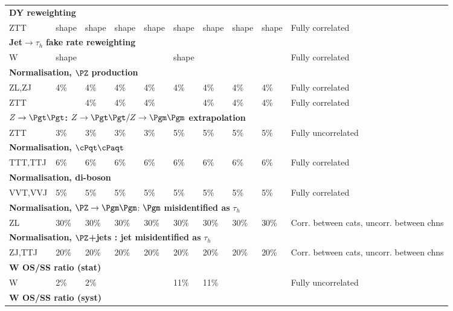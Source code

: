 \begin{table}[!h]
\begin{center}
{\begin{tabular}{p{2cm}|p{1cm}p{1cm}p{1cm}p{1cm}|p{1cm}p{1cm}p{1cm}p{1cm}|p{3cm}}
    \multicolumn{10}{l}{\textbf{DY reweighting } }\\
    ZTT       & shape & shape & shape & shape  & shape & shape & shape & shape &Fully correlated              \\
    \hline
    \multicolumn{10}{l}{\textbf{Jet}$\rightarrow\tau_h$ \textbf{fake rate reweighting } }\\
    W         & shape &  &  &   & shape &  &  &  &Fully correlated              \\
    \hline
    \multicolumn{10}{l}{\textbf{Normalisation, }$\PZ$ \textbf{production} }\\
    ZL,ZJ       & 4\% & 4\% & 4\% & 4\% & 4\%  & 4\% & 4\% & 4\% & Fully correlated              \\
    ZTT         &  & 4\% & 4\% & 4\% &  & 4\% & 4\% & 4\% & Fully correlated              \\
   \multicolumn{10}{l}{ $Z\to\Pgt\Pgt$\textbf{: $Z\to\Pgt\Pgt / Z\to\Pgm\Pgm$ extrapolation } } \\
    ZTT         & 3\% & 3\% & 3\% & 3\% & 5\% & 5\% & 5\% & 5\% & Fully uncorrelated           \\
    \multicolumn{10}{l}{\textbf{Normalisation,} $\cPqt\cPaqt$}\\
    TTT,TTJ     & 6\% & 6\% & 6\% & 6\%   & 6\% & 6\% &6\% & 6\%  & Fully correlated                \\
    \multicolumn{10}{l}{\textbf{Normalisation, di-boson} } \\
    VVT,VVJ     & 5\% & 5\% & 5\% & 5\%   & 5\% & 5\% & 5\% & 5\% & Fully correlated         \\
   \multicolumn{10}{l}{ \textbf{Normalisation,} $\PZ\to\Pgm\Pgm$: $\Pgm$ \textbf{misidentified as} $\tau_{h}$ }\\
    ZL     & 30\%  & 30\% & 30\% & 30\%   & 30\% & 30\% & 30\% &30\% &Corr. between cats, uncorr. between chns        \\
    \multicolumn{10}{l}{\textbf{Normalisation,} $\PZ$\textbf{+jets : jet misidentified as} $\tau_{h}$ } \\
    ZJ,TTJ     & 20\%  & 20\% &20\% &20\%      & 20\% & 20\% &20\% &20\%  & Corr. between cats, uncorr. between chns  \\
    \hline
    \multicolumn{10}{l}{\textbf{W OS/SS ratio (stat) } } \\
    W & 2\% & 2\% & & &11\% &11\% & & & Fully uncorrelated \\
    \multicolumn{10}{l}{\textbf{W OS/SS ratio (syst) } }\\

\end{tabular}}
\end{center}
\end{table}

